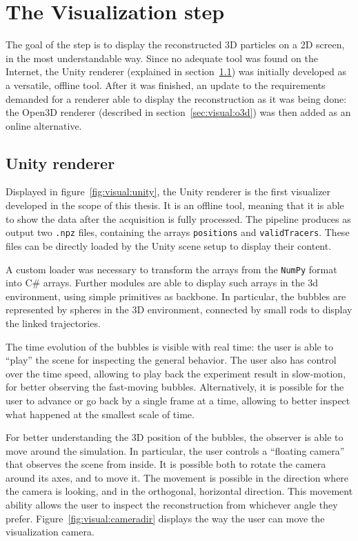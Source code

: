\chapter{The Visualization step}
\label{chap:visual}

The goal of the \visual* step is to display the reconstructed 3D particles on a 2D screen, in the most understandable way.
Since no adequate tool was found on the Internet, the Unity renderer (explained in section~\ref{sec:visual:unity}) was initially developed as a versatile, offline tool.
After it was finished, an update to the requirements demanded for a renderer able to display the reconstruction as it was being done: the Open3D renderer (described in section~\ref{sec:visual:o3d}) was then added as an online alternative.

\section{Unity renderer}
\label{sec:visual:unity}

Displayed in figure~\ref{fig:visual:unity}, the Unity renderer is the first visualizer developed in the scope of this thesis.
It is an offline tool, meaning that it is able to show the data after the acquisition is fully processed.
The pipeline produces as output two \texttt{.npz} files, containing the arrays \texttt{positions} and \texttt{validTracers}.
These files can be directly loaded by the Unity scene setup to display their content.

A custom loader was necessary to transform the arrays from the \texttt{NumPy} format into C\# arrays.
Further modules are able to display such arrays in the 3d environment, using simple primitives as backbone.
In particular, the bubbles are represented by spheres in the 3D environment, connected by small rods to display the linked trajectories.

The time evolution of the bubbles is visible with real time: the user is able to ``play'' the scene for inspecting the general behavior.
The user also has control over the time speed, allowing to play back the experiment result in slow-motion, for better observing the fast-moving bubbles.
Alternatively, it is possible for the user to advance or go back by a single frame at a time, allowing to better inspect what happened at the smallest scale of time.

For better understanding the 3D position of the bubbles, the observer is able to move around the simulation.
In particular, the user controls a ``floating camera'' that observes the scene from inside.
It is possible both to rotate the camera around its axes, and to move it.
The movement is possible in the direction where the camera is looking, and in the orthogonal, horizontal direction.
This movement ability allows the user to inspect the reconstruction from whichever angle they prefer.
Figure~\ref{fig:visual:cameradir} displays the way the user can move the visualization camera.

